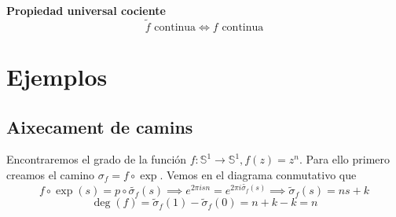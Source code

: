 \documentclass[leqno]{article}
\begin{document}
\begin{minipage}{0.7\textwidth}
\textbf{Propiedad universal cociente}
\[
\tilde{f} \text{ continua}  \iff f \text{ continua}
\] 
\end{minipage}
\begin{minipage}{0.3\textwidth}
\end{minipage}

\section{Ejemplos}
\subsection{Aixecament de camins}
\begin{minipage}{0.8\textwidth}
Encontraremos el grado de la función $f: \mathbb{S}^1 \to \mathbb{S}^1 , f(z)= z^n$. Para ello primero creamos el camino $\sigma_f = f\circ \exp$. Vemos en el diagrama conmutativo que
 \[
f\circ \exp (s) = p \circ \tilde{\sigma _f}(s)  \implies e^{2\pi i s n} = e^{2\pi i \tilde{\sigma _f}(s)} \implies \tilde{\sigma }_f(s) = ns + k 
\] 
\[
\deg(f) = \tilde{\sigma}_f(1)-\tilde{\sigma }_f(0) = n+k-k = n
\] 
\end{minipage}
\begin{minipage}{0.2\textwidth}
\end{minipage}
\end{document}
